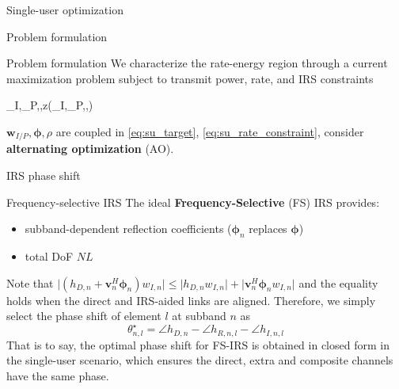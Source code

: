 \documentclass[9pt]{beamer}
\begin{document}
\begin{section}{Single-user optimization}
	\begin{subsection}{Problem formulation}
		\begin{frame}{Problem formulation}
			We characterize the rate-energy region through a current maximization problem subject to transmit power, rate, and IRS constraints
			\begin{maxi!}
				{\boldsymbol{w}_I,_P,\boldsymbol{\phi},\rho}{z(\boldsymbol{w}_I,_P,\boldsymbol{\phi},\rho)}{\label{op:su}}{\label{eq:su_target}}
				\label{eq:su_rate_constraint}
			\end{maxi!}
			\vspace{1em}
			$\boldsymbol{w}_{I/P},\boldsymbol{\phi},\rho$ are coupled in \ref{eq:su_target}, \ref{eq:su_rate_constraint}, consider \textbf{alternating optimization} (AO).
		\end{frame}
	\end{subsection}

	\begin{subsection}{IRS phase shift}
		\begin{frame}{Frequency-selective IRS}
			The ideal \textbf{Frequency-Selective} (FS) IRS provides:
			\begin{itemize}
				\item subband-dependent reflection coefficients ($\boldsymbol{\phi}_n$ replaces $\boldsymbol{\phi}$)
				\item total DoF $NL$
			\end{itemize}
			\vspace{1em}
			Note that $\lvert{(h_{D,n}+\boldsymbol{v}_n^H\boldsymbol{\phi}_n)w_{I,n}}\rvert \le \lvert{h_{D,n}w_{I,n}}\rvert+\lvert{\boldsymbol{v}_n^H\boldsymbol{\phi}_n w_{I,n}}\rvert$ and the equality holds when the direct and IRS-aided links are aligned. Therefore, we simply select the phase shift of element $l$ at subband $n$ as
			\begin{equation}
				\theta_{n,l}^\star = \angle{h}_{D,n} - \angle{h_{R,n,l}}-\angle{h_{I,n,l}}
			\end{equation}
			That is to say, the optimal phase shift for FS-IRS is obtained in closed form in the single-user scenario, which ensures the direct, extra and composite channels have the same phase.
		\end{frame}


\end{subsection}
\end{section}
\end{document}
